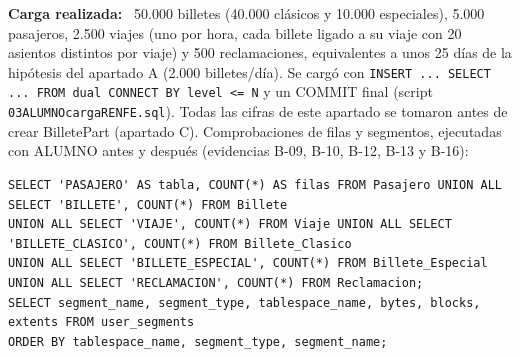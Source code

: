\documentclass[11pt,a4paper]{article}
\DeclareRobustCommand{\_}{\textunderscore\allowbreak}
\newcommand{\tb}[1]{\texttt{#1}}
\newcommand{\campo}[1]{\textbf{#1:}~}                 %
\begin{document}
\campo{Carga realizada} 50.000 billetes (40.000 clásicos y 10.000 especiales), 5.000 pasajeros, 2.500 viajes (uno por hora, cada billete ligado a su viaje con 20 asientos distintos por viaje) y 500 reclamaciones, equivalentes a unos 25 días de la hipótesis del apartado A (2.000 billetes/día). Se cargó con \tb{INSERT ... SELECT ... FROM dual CONNECT BY level <= N} y un COMMIT final (script \tb{03\_ALUMNO\_carga\_RENFE.sql}). Todas las cifras de este apartado se tomaron antes de crear Billete\_Part (apartado C). Comprobaciones de filas y segmentos, ejecutadas con ALUMNO antes y después (evidencias B-09, B-10, B-12, B-13 y B-16):
\begin{lstlisting}
SELECT 'PASAJERO' AS tabla, COUNT(*) AS filas FROM Pasajero UNION ALL SELECT 'BILLETE', COUNT(*) FROM Billete
UNION ALL SELECT 'VIAJE', COUNT(*) FROM Viaje UNION ALL SELECT 'BILLETE_CLASICO', COUNT(*) FROM Billete_Clasico
UNION ALL SELECT 'BILLETE_ESPECIAL', COUNT(*) FROM Billete_Especial UNION ALL SELECT 'RECLAMACION', COUNT(*) FROM Reclamacion;
SELECT segment_name, segment_type, tablespace_name, bytes, blocks, extents FROM user_segments
ORDER BY tablespace_name, segment_type, segment_name;
\end{lstlisting}
\end{document}
